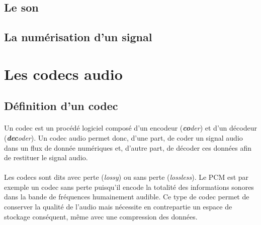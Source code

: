 \documentclass{article}
\begin{document}
    \subsection{Le son}





    \subsection{La numérisation d'un signal}
    \label{audionumerique}


    \newpage
    \section{Les codecs audio}
    \subsection{Définition d'un codec}
    \paragraph{}
    Un codec est un procédé logiciel composé d'un encodeur (\emph{\textbf{co}der}) et d'un décodeur (\emph{\textbf{dec}oder})\cite{wiki:codec}. Un codec audio permet donc, d'une part, de coder un signal audio dans un flux de donnée numériques et, d'autre part, de décoder ces données afin de restituer le signal audio.

    \paragraph{}
    Les codecs sont dits avec perte (\emph{lossy}) ou sans perte (\emph{lossless}). Le PCM est par exemple un codec sans perte puisqu'il encode la totalité des informations sonores dans la bande de fréquences humainement audible. Ce type de codec permet de conserver la qualité de l'audio mais nécessite en contrepartie un espace de stockage conséquent, même avec une compression des données.
\end{document}
